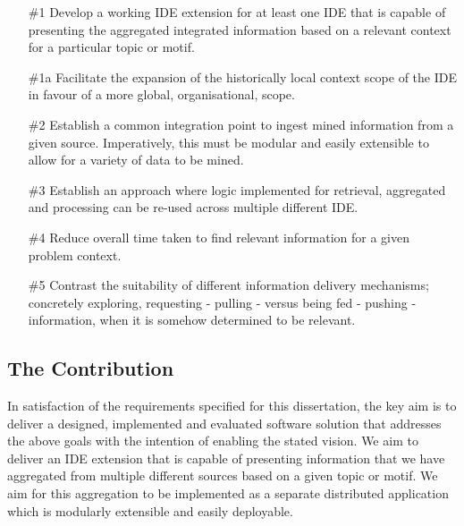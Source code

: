\newcommand{\printGoals}{
\label{Objectives}
\begin{enumerate}
	
	\label{objective:1}
	\item[\#1] Develop a working IDE extension for at least one IDE that is capable of presenting the aggregated integrated information based on a relevant context for a particular topic or motif. 
	
	\item[\#1a] Facilitate the expansion of the historically local context scope of the IDE in favour of a more global, organisational, scope.
	
	\label{objective:2}
	\item[\#2] Establish a common integration point to ingest mined information from a given source. Imperatively, this must be modular and easily extensible to allow for a variety of data to be mined.
	
	\label{objective:3}
	\item[\#3] Establish an approach where logic implemented for retrieval, aggregated and processing can be re-used across multiple different IDE.
	
	\label{objective:4}
	\item[\#4] Reduce overall time taken to find relevant information for a given problem context.
	
	\label{objective:5}
	\item[\#5] Contrast the suitability of different information delivery mechanisms; concretely exploring, requesting - pulling - versus being fed - pushing - information, when it is somehow determined to be relevant. 
	
\end{enumerate}
}

\printGoals

\subsection{The Contribution}

In satisfaction of the requirements specified for this dissertation, the key aim is to deliver a designed, implemented and evaluated software solution that addresses the above goals with the intention of enabling the stated vision. We aim to deliver an IDE extension that is capable of presenting information that we have aggregated from multiple different sources based on a given topic or motif. We aim for this aggregation to be implemented as a separate distributed application which is modularly extensible and easily deployable.